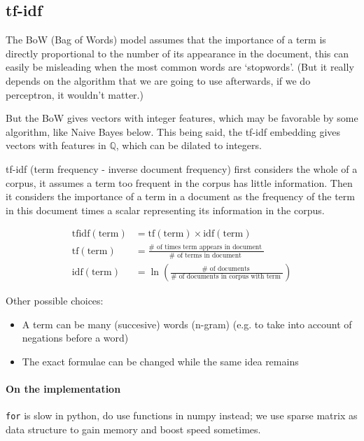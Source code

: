 \documentclass{article}
\begin{document}
\subsection{tf-idf}

The BoW (Bag of Words) model assumes that the importance of a term is directly proportional to
the number of its appearance in the document, this can easily be misleading
when the most common words are `stopwords'. (But it really depends on
the algorithm that we are going to use afterwards, if we do perceptron, it wouldn't matter.)

But the BoW gives vectors with integer features, which may be favorable by some algorithm,
like Naive Bayes below. This being said, the tf-idf embedding gives vectors with features in $\mathbb{Q}$,
which can be dilated to integers.

tf-idf (term frequency - inverse document frequency) first considers
the whole of a corpus, it assumes a term too frequent in the corpus has little
information. Then it considers the importance of a term in a document
as the frequency of the term in this document times a scalar
representing its information in the corpus.

$$
\begin{aligned}
\mathrm{tfidf}(\mathrm{term}) & = \mathrm{tf}(\mathrm{term}) \times \mathrm{idf}(\mathrm{term}) \\
\mathrm{tf}(\mathrm{term}) & = \frac{\# \text { of times term appears in document }}{\# \text { of terms in document }} \\
\mathrm{idf}(\mathrm{term}) & =\ln \left(\frac{\# \text { of documents }}{\# \text { of documents in corpus with term }}\right)
\end{aligned}
$$

Other possible choices:

\begin{itemize}
  \item A term can be many (succesive) words (n-gram) (e.g. to
  take into account of negations before a word)
  \item The exact formulae can be changed while the same idea remains
\end{itemize}

\paragraph{On the implementation} \verb|for| is slow in python, do use
functions in numpy instead; we use sparse matrix as data structure to
gain memory and boost speed sometimes.
\end{document}
